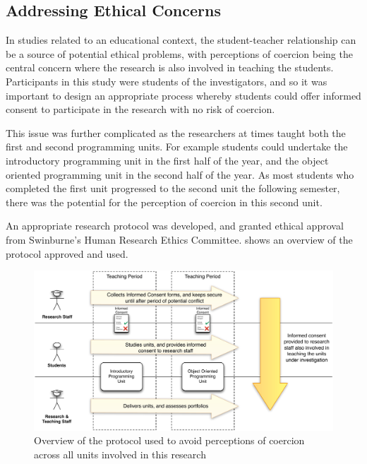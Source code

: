 
\clearpage
\subsection{Addressing Ethical Concerns} %
\label{sub:addressing_ethical_concerns}

In studies related to an educational context, the student-teacher relationship can be a source of potential ethical problems, with perceptions of coercion being the central concern where the research is also involved in teaching the students. Participants in this study were students of the investigators, and so it was important to design an appropriate process whereby students could offer informed consent to participate in the research with no risk of coercion.  

This issue was further complicated as the researchers at times taught both the first and second programming units. For example students could undertake the introductory programming unit in the first half of the year, and the object oriented programming unit in the second half of the year. As most students who completed the first unit progressed to the second unit the following semester, there was the potential for the perception of coercion in this second unit.

An appropriate research protocol was developed, and granted ethical approval from Swinburne's Human Research Ethics Committee.  shows an overview of the protocol approved and used.

\begin{figure}[thb]
  \centering
  \includegraphics[width=\textwidth]{EthicsProcess}
  \caption{Overview of the protocol used to avoid perceptions of coercion across all units involved in this research}
  \label{fig:ethics_process}
\end{figure}

